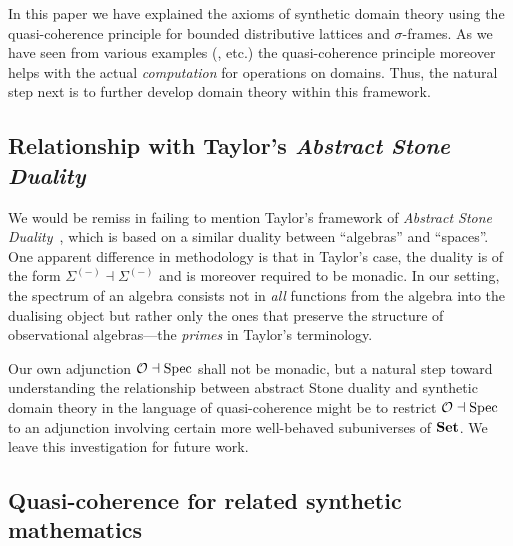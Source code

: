 In this paper we have explained the axioms of synthetic domain theory using the quasi-coherence principle for bounded distributive lattices and $\sigma$-frames. As we have seen from various examples (,  etc.) the quasi-coherence principle moreover helps with the actual \emph{computation} for operations on domains. Thus, the natural step next is to further develop domain theory within this framework.


\subsection{Relationship with Taylor's \emph{Abstract Stone Duality}}

We would be remiss in failing to mention Taylor's framework of \emph{Abstract Stone Duality}~\citep{Taylor2011,TaylorP:insema,TaylorP:sobsc}, which is based on a similar duality between ``algebras'' and ``spaces''. One apparent difference in methodology is that in Taylor's case, the duality is of the form $\Sigma^{(-)} \dashv \Sigma^{(-)}$ and is moreover required to be monadic. In our setting, the spectrum of an algebra consists not in \emph{all} functions from the algebra into the dualising object but rather only the ones that preserve the structure of observational algebras—the \emph{primes} in Taylor's terminology.

Our own adjunction $\mathcal{O}\dashv\operatorname{Spec}$ shall not be monadic, but a natural step toward understanding the relationship between abstract Stone duality and synthetic domain theory in the language of quasi-coherence might be to restrict $\mathcal{O}\dashv\operatorname{Spec}$ to an adjunction involving certain more well-behaved subuniverses of $\mathbf{Set}$. We leave this investigation for future work.

\subsection{Quasi-coherence for related synthetic mathematics}

